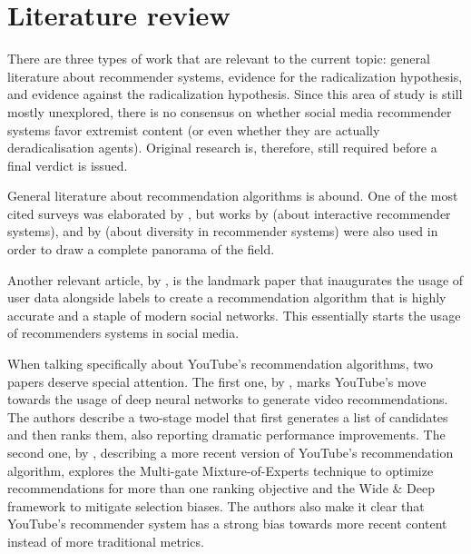 
\chapter{Literature review}

There are three types of work that are relevant to the current topic: general
literature about recommender systems, evidence for the radicalization
hypothesis, and evidence against the radicalization hypothesis. Since this area
of study is still mostly unexplored, there is no consensus on whether
social media recommender systems favor extremist content (or even whether they
are actually deradicalisation agents). Original research is, therefore, still
required before a final verdict is issued.

General literature about recommendation algorithms is abound. One of the most
cited surveys was elaborated by \citet{bobadilla_recommender_2013}, but
works by \citet{he_interactive_2016} (about interactive recommender systems),
and by \citet{kunaver_diversity_2017} (about diversity in recommender systems)
were also used in order to draw a complete panorama of the field.

Another relevant article, by \citet{guy_social_2010}, is the landmark paper that
inaugurates the usage of user data alongside labels to create a recommendation
algorithm that is highly accurate and a staple of modern social networks. This
essentially starts the usage of recommenders systems in social media.

When talking specifically about YouTube's recommendation algorithms, two papers
deserve special attention. The first one, by \citet{covington_deep_2016}, marks
YouTube's move towards the usage of deep neural networks to generate video
recommendations. The authors describe a two-stage model that first generates a
list of candidates and then ranks them, also reporting dramatic performance
improvements. The second one, by \citet{zhao_recommending_2019}, describing a
more recent version of YouTube's recommendation algorithm, explores the
Multi-gate Mixture-of-Experts technique to optimize recommendations for more
than one ranking objective and the Wide \& Deep framework to mitigate selection
biases. The authors also make it clear that YouTube's recommender system has a
strong bias towards more recent content instead of more traditional metrics.

